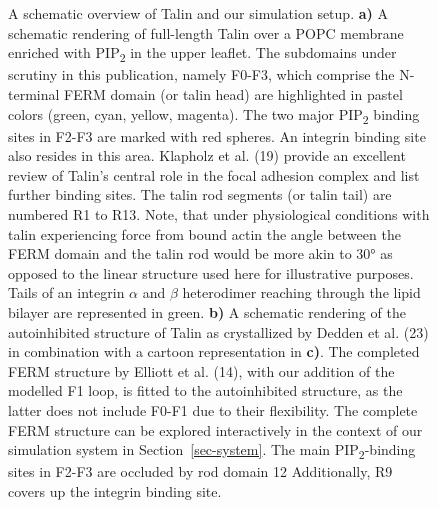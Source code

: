 \documentclass[
  letterpaper,
  DIV=11,
  numbers=noendperiod]{scrartcl}
\begin{document}
\begin{figure}
\begin{minipage}[t]{0.50\linewidth}
{\centering 


}

\subcaption{\label{fig-tln-align-autoinhib}~}
\end{minipage}%

\caption{\label{fig-structure}A schematic overview of Talin and our
simulation setup. \textbf{a)} A schematic rendering of full-length Talin
over a POPC membrane enriched with PIP\textsubscript{2} in the upper
leaflet. The subdomains under scrutiny in this publication, namely
F0-F3, which comprise the N-terminal FERM domain (or talin head) are
highlighted in pastel colors (green, cyan, yellow, magenta). The two
major PIP\textsubscript{2} binding sites in F2-F3 are marked with red
spheres. An integrin binding site also resides in this area. Klapholz et
al. (19) provide an excellent review of Talin's central role in the
focal adhesion complex and list further binding sites. The talin rod
segments (or talin tail) are numbered R1 to R13. Note, that under
physiological conditions with talin experiencing force from bound actin
the angle between the FERM domain and the talin rod would be more akin
to 30° as opposed to the linear structure used here for illustrative
purposes. Tails of an integrin \(\alpha\) and \(\beta\) heterodimer
reaching through the lipid bilayer are represented in green. \textbf{b)}
A schematic rendering of the autoinhibited structure of Talin as
crystallized by Dedden et al. (23) in combination with a cartoon
representation in \textbf{c)}. The completed FERM structure by Elliott
et al. (14), with our addition of the modelled F1 loop, is fitted to the
autoinhibited structure, as the latter does not include F0-F1 due to
their flexibility. The complete FERM structure can be explored
interactively in the context of our simulation system in
Section~\ref{sec-system}. The main PIP\textsubscript{2}-binding sites in
F2-F3 are occluded by rod domain 12 Additionally, R9 covers up the
integrin binding site.}

\end{figure}
\end{document}
